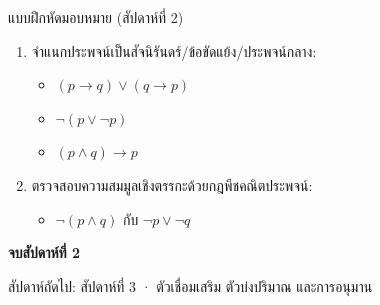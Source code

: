 \begin{frame}{แบบฝึกหัดมอบหมาย (สัปดาห์ที่ 2)}
  \begin{enumerate}\small
    \item จำแนกประพจน์เป็นสัจนิรันดร์/ข้อขัดแย้ง/ประพจน์กลาง:
          \begin{itemize}
            \item $(p\rightarrow q)\lor(q\rightarrow p)$
            \item $\neg(p\lor\neg p)$
            \item $(p\land q)\rightarrow p$
          \end{itemize}
    \item ตรวจสอบความสมมูลเชิงตรรกะด้วยกฎพีชคณิตประพจน์:
          \begin{itemize}
            \item $\neg(p\land q)$ กับ $\neg p\lor\neg q$
          \end{itemize}
  \end{enumerate}
\end{frame}

\begin{frame}[plain]
  \vfill
  \centering
  {\Large\color{navy}\textbf{จบสัปดาห์ที่ 2}}\par
  \vspace{0.8em}
  {\color{gray} สัปดาห์ถัดไป: สัปดาห์ที่ 3 · ตัวเชื่อมเสริม ตัวบ่งปริมาณ และการอนุมาน}
  \vfill
\end{frame}

